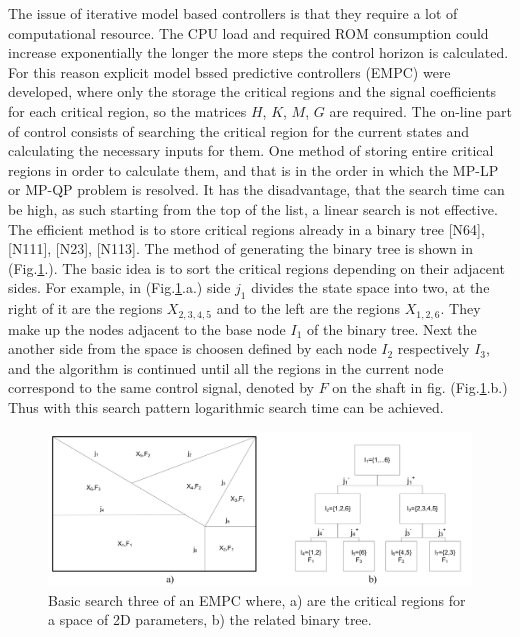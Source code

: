 The issue of iterative model based controllers is that they require a lot of computational resource. The CPU load and required ROM consumption could increase exponentially the longer the more steps the control horizon is calculated. For this reason explicit model bssed predictive controllers (EMPC) were developed, where only the storage the critical regions and the signal coefficients for each critical region, so the matrices $H$, $K$, $M$, $G$ are required. The on-line part of control consists of searching the critical region for the current states and calculating the necessary inputs for them.
One method of storing entire critical regions in order to calculate them, and that is in the order in which the MP-LP or MP-QP problem is resolved. It has the disadvantage, that the search time can be high, as such starting from the top of the list, a linear search is not effective. The efficient method is to store critical regions already in a binary tree [N64], [N111], [N23], [N113]. The method of generating the binary tree is shown in (Fig.\ref{BASICMPC:fig:searchtree}.). The basic idea is to sort the critical regions
depending on their adjacent sides. For example, in (Fig.\ref{BASICMPC:fig:searchtree}.a.) side $j_1$ divides the state space into two, at the right of it are the regions $X_{2,3,4,5}$ and to the left are the regions $X_{1,2,6}$. They make up the nodes adjacent to the base node $I_1$ of the binary tree. Next the another side from the space is choosen defined by each node $I_2$ respectively $I_3$, and the algorithm is continued until all the regions in the current node correspond to the same control signal, denoted by $F$ on the shaft in fig. (Fig.\ref{BASICMPC:fig:searchtree}.b.) Thus with this search pattern logarithmic search time can be achieved.

 \begin{figure}[!ht]
        \centering
        \includegraphics[width=\textwidth]{EMPC_PNG_Pics/BasicSearchTree.png}
        \caption{Basic search three of an EMPC where, a) are the critical regions for a space of 2D parameters,
b) the related binary tree.}
        \label{BASICMPC:fig:searchtree}
    \end{figure}

